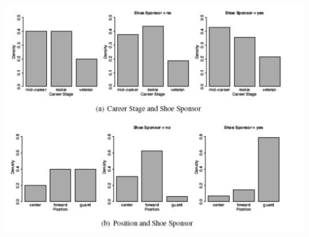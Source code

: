 \documentclass[aspectratio=169,xcolor=dvipsnames]{beamer}
\begin{document}
\begin{frame}
\centering
\includegraphics[scale=0.45]{images/hist_grid.png}
\end{frame}
\end{document}
